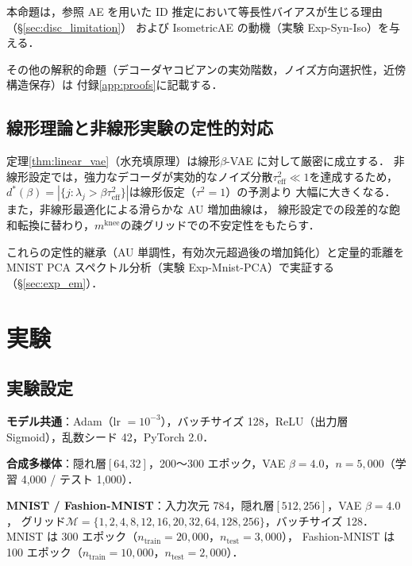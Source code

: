 \documentclass[11pt,a4paper]{jsarticle}
\newcommand{\mknee}{m^{\mathrm{knee}}}
\begin{document}
本命題は，参照 AE を用いた ID 推定において等長性バイアスが生じる理由（§\ref{sec:disc_limitation}）
および IsometricAE の動機（実験 Exp-Syn-Iso）を与える．

その他の解釈的命題（デコーダヤコビアンの実効階数，ノイズ方向選択性，近傍構造保存）は
付録\ref{app:proofs}に記載する．

\subsection{線形理論と非線形実験の定性的対応}\label{sec:theory_bridge}

定理\ref{thm:linear_vae}（水充填原理）は線形$\beta$-VAE に対して厳密に成立する．
非線形設定では，強力なデコーダが実効的なノイズ分散$\tau^2_\mathrm{eff} \ll 1$を達成するため，
$d^*(\beta) = |\{j : \lambda_j > \beta\tau^2_\mathrm{eff}\}|$は線形仮定（$\tau^2=1$）の予測より
大幅に大きくなる．また，非線形最適化による滑らかな AU 増加曲線は，
線形設定での段差的な飽和転換に替わり，$\mknee$の疎グリッドでの不安定性をもたらす．

これらの定性的継承（AU 単調性，有効次元超過後の増加鈍化）と定量的乖離を
MNIST PCA スペクトル分析（実験 Exp-Mnist-PCA）で実証する（§\ref{sec:exp_em}）．

\section{実験}\label{sec:exp}

\subsection{実験設定}\label{sec:exp_setup}

\textbf{モデル共通}：Adam（lr $= 10^{-3}$），バッチサイズ 128，ReLU（出力層 Sigmoid），乱数シード 42，PyTorch 2.0．

\textbf{合成多様体}：隠れ層$[64, 32]$，200〜300 エポック，VAE $\beta = 4.0$，$n = 5{,}000$（学習 4,000 / テスト 1,000）．

\textbf{MNIST / Fashion-MNIST}：入力次元 784，隠れ層$[512, 256]$，VAE $\beta = 4.0$，
グリッド$\mathcal{M} = \{1,2,4,8,12,16,20,32,64,128,256\}$，バッチサイズ 128．
MNIST は 300 エポック（$n_{\mathrm{train}} = 20{,}000$，$n_{\mathrm{test}} = 3{,}000$），
Fashion-MNIST は 100 エポック（$n_{\mathrm{train}} = 10{,}000$，$n_{\mathrm{test}} = 2{,}000$）．
\end{document}
